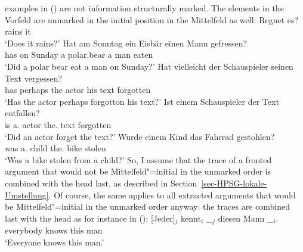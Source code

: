examples in () are not information structurally marked. The elements in the Vorfeld are
unmarked in the initial position in the Mittelfeld as well:
\eal
\ex
\gll Regnet es?\\
     rains it\\
\glt `Does it rains?'
\ex 
\gll Hat am Sonntag ein Eisbär einen Mann gefressen?\\
     has on Sunday  a   polar.bear a man eaten\\
\glt `Did a polar bear eat a man on Sunday?'
\ex 
\gll Hat vielleicht der Schauspieler seinen Text vergessen?\\
     has perhaps    the actor his text forgotten\\
\glt `Has the actor perhaps forgotton his text?'
\ex 
\gll Ist einem Schauspieler der Text entfallen?\\
     is  a.\dat{} actor     the.\nom{} text forgotten\\
\glt `Did an actor forget the text?'
\ex
\gll Wurde einem Kind das Fahrrad gestohlen?\\
     was a.\dat{} child the.\nom{} bike stolen\\
\glt `Was a bike stolen from a child?'
\zl
So, I assume that the trace of a fronted argument that would not be Mittelfeld"=initial in the unmarked order is combined with
the head last, as described in Section~\ref{sec-HPSG-lokale-Umstellung}. Of course, the same applies
to all extracted arguments that would be Mittelfeld"=initial in the unmarked order anyway: the
traces are combined last with the head as for instance in ():
\ea
\label{Beispiel-jeder-kennt-diesen-Mann-HPSG}
\gll {}[Jeder]$_j$ kennt$_i$ \_$_j$ diesen Mann \_$_i$.\\
	 {}\spacebr{}everybody knows {} this man\\
\glt `Everyone knows this man.'
\z

